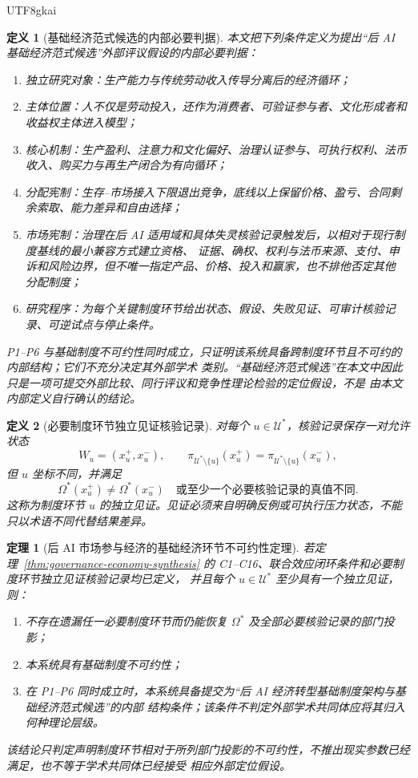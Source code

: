 \documentclass[12pt,a4paper,openany]{report}
\newtheorem{definition}{定义}[chapter]
\newtheorem{theorem}{定理}[chapter]
\begin{document}
\begin{CJK*}{UTF8}{gkai}
\begin{definition}[基础经济范式候选的内部必要判据]
本文把下列条件定义为提出“后 AI 基础经济范式候选”外部评议假设的内部必要判据：
\begin{enumerate}[label=\textup{(P\arabic*)},leftmargin=4em]
  \item 独立研究对象：生产能力与传统劳动收入传导分离后的经济循环；
  \item 主体位置：人不仅是劳动投入，还作为消费者、可验证参与者、文化形成者和收益权主体进入模型；
  \item 核心机制：生产盈利、注意力和文化偏好、治理认证参与、可执行权利、法币收入、购买力与再生产闭合为有向循环；
  \item 分配宪制：生存--市场接入下限退出竞争，底线以上保留价格、盈亏、合同剩余索取、能力差异和自由选择；
  \item 市场宪制：治理在后 AI 适用域和具体失灵核验记录触发后，以相对于现行制度基线的最小兼容方式建立资格、
  证据、确权、权利与法币来源、支付、申诉和风险边界，但不唯一指定产品、价格、投入和赢家，也不排他否定其他
  分配制度；
  \item 研究程序：为每个关键制度环节给出状态、假设、失败见证、可审计核验记录、可逆试点与停止条件。
\end{enumerate}
P1--P6 与基础制度不可约性同时成立，只证明该系统具备跨制度环节且不可约的内部结构；它们不充分决定其外部学术
类别。“基础经济范式候选”在本文中因此只是一项可提交外部比较、同行评议和竞争性理论检验的定位假设，不是
由本文内部定义自行确认的结论。
\end{definition}

\begin{definition}[必要制度环节独立见证核验记录]
对每个 \(u\in\mathcal U^*\)，核验记录保存一对允许状态
\[
  W_u=(x_u^+,x_u^-),
  \qquad
  \pi_{\mathcal U^*\setminus\{u\}}(x_u^+)
  =
  \pi_{\mathcal U^*\setminus\{u\}}(x_u^-),
\]
但 \(u\) 坐标不同，并满足
\[
  \Omega^*(x_u^+)\ne\Omega^*(x_u^-)
  \quad\text{或至少一个必要核验记录的真值不同}.
\]
这称为制度环节 \(u\) 的独立见证。见证必须来自明确反例或可执行压力状态，不能只以术语不同代替结果差异。
\end{definition}

\begin{theorem}[后 AI 市场参与经济的基础经济环节不可约性定理]
\label{thm:nonsectoral-theoretical-position}
若定理~\ref{thm:governance-economy-synthesis} 的 C1--C16、联合效应闭环条件和必要制度环节独立见证核验记录均已定义，
并且每个 \(u\in\mathcal U^*\) 至少具有一个独立见证，则：
\begin{enumerate}[label=\textup{(T\arabic*)},leftmargin=4em]
  \item 不存在遗漏任一必要制度环节而仍能恢复 \(\Omega^*\) 及全部必要核验记录的部门投影；
  \item 本系统具有基础制度不可约性；
  \item 在 P1--P6 同时成立时，本系统具备提交为“后 AI 经济转型基础制度架构与基础经济范式候选”的内部
  结构条件；该条件不判定外部学术共同体应将其归入何种理论层级。
\end{enumerate}
该结论只判定声明制度环节相对于所列部门投影的不可约性，不推出现实参数已经满足，也不等于学术共同体已经接受
相应外部定位假设。
\end{theorem}


\end{CJK*}
\end{document}
